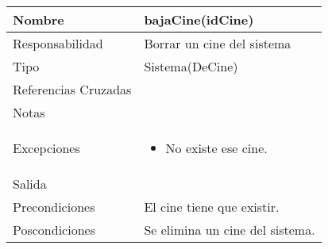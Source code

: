 \documentclass{article}
\begin{document}
\begin{table}[h]
\begin{tabular}{|l|l|l|l|l|l|}
\hline
\multicolumn{2}{|p{3cm}|}{Nombre} & \multicolumn{4}{p{10cm}|}{\textbf{bajaCine(idCine)}}\\
\hline
\multicolumn{2}{|p{3cm}|}{Responsabilidad} & \multicolumn{4}{p{10cm}|}{Borrar un cine del sistema} \\
\hline
\multicolumn{2}{|p{3cm}|}{Tipo} & \multicolumn{4}{p{10cm}|}{Sistema(DeCine)} \\
\hline
\multicolumn{2}{|p{3cm}|}{Referencias Cruzadas} & \multicolumn{4}{p{10cm}|}{} \\
\hline
\multicolumn{2}{|p{3cm}|}{Notas} & \multicolumn{4}{p{10cm}|}{} \\
\hline
\multicolumn{2}{|p{3cm}|}{Excepciones} & \multicolumn{4}{p{10cm}|}{\begin{itemize}
\item No existe ese cine.
\end{itemize}} \\
\hline
\multicolumn{2}{|p{3cm}|}{Salida} & \multicolumn{4}{p{10cm}|}{} \\
\hline
\multicolumn{2}{|p{3cm}|}{Precondiciones} & \multicolumn{4}{p{10cm}|}{El cine tiene que existir.} \\
\hline
\multicolumn{2}{|p{3cm}|}{Poscondiciones} & \multicolumn{4}{p{10cm}|}{Se elimina un cine del sistema.} \\
\hline
\end{tabular}
\end{table}
\end{document}
